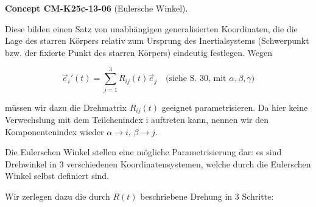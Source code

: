 \documentclass[10pt, letterpaper]{article}
\newcommand{\CustomHeading}[3]{%
  \par\medskip\noindent%
  \textbf{#1 #2} \textnormal{(#3)}.\enskip%
}
\newenvironment{CONC}[2]{\CustomHeading{Concept}{#1}{#2}}{}
\begin{document}
\begin{CONC}{CM-K25c-13-06}{Eulersche Winkel}
Diese bilden einen Satz von unabhängigen generalisierten Koordinaten, die die Lage des starren Körpers relativ zum Ursprung des Inertialsystems (Schwerpunkt bzw. der fixierte Punkt des starren Körpers) eindeutig festlegen. Wegen

\[
\vec{e}_i'(t) = \sum_{j=1}^3 R_{ij}(t) \vec{e}_j \quad \text{(siehe S. 30, mit }\alpha,\beta,\gamma\text{)}
\]

\noindent
müssen wir dazu die Drehmatrix $R_{ij}(t)$ geeignet parametrisieren. Da hier keine Verwechslung mit dem Teilchenindex i auftreten kann, nennen wir den Komponentenindex wieder $\alpha \to i$, $\beta \to j$.

Die Eulerschen Winkel stellen eine mögliche Parametrisierung dar: es sind Drehwinkel in 3 verschiedenen Koordinatensystemen, welche durch die Eulerschen Winkel selbst definiert sind.

Wir zerlegen dazu die durch $R(t)$ beschriebene Drehung in 3 Schritte:

\begin{center}
\end{center}
\end{CONC}
\end{document}
